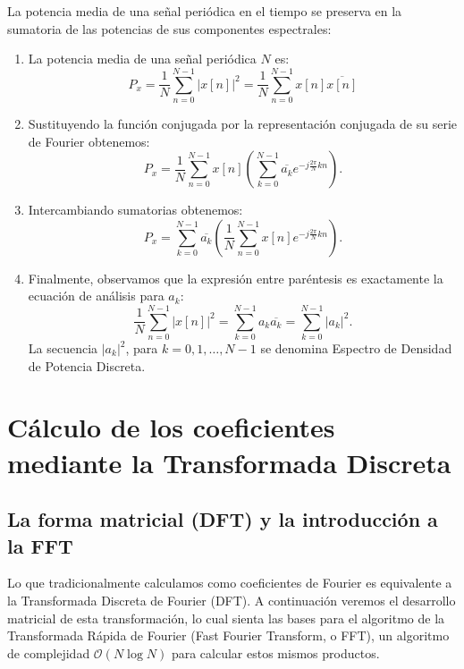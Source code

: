 \documentclass[11pt,a4paper,openany]{book}
\begin{document}
La potencia media de una señal periódica en el tiempo se preserva en la sumatoria de las potencias de sus componentes espectrales:
\begin{enumerate}
	\item La potencia media de una señal periódica $N$ es:
	\begin{equation}
		P_x = \frac{1}{N}\sum_{n=0}^{N-1} |x[n]|^{2} = \frac{1}{N}\sum_{n=0}^{N-1} x[n] \overline{x[n]}
	\end{equation}
	
	\item Sustituyendo la función conjugada por la representación conjugada de su serie de Fourier obtenemos:
	\begin{equation}
		P_x = \frac{1}{N} \sum_{n=0}^{N-1} x[n] \left(\sum_{k=0}^{N-1} \overline{a_{k}} e^{-j\frac{2\pi}{N}kn} \right).
	\end{equation}
	
	\item Intercambiando sumatorias obtenemos:
	\begin{equation}
		P_x = \sum_{k=0}^{N-1} \overline{a_{k}} \left( \frac{1}{N}\sum_{n=0}^{N-1} x[n] e^{-j\frac{2\pi}{N}kn} \right).
	\end{equation}
	
	\item Finalmente, observamos que la expresión entre paréntesis es exactamente la ecuación de análisis para $a_{k}$:
	\begin{equation}
		\frac{1}{N}\sum_{n=0}^{N-1} |x[n]|^{2} = \sum_{k=0}^{N-1} a_{k} \overline{a_{k}} = \sum_{k=0}^{N-1} |a_{k}|^2.
	\end{equation}
	La secuencia $|a_{k}|^{2}$, para $k = 0, 1, \dots, N - 1$ se denomina Espectro de Densidad de Potencia Discreta.
\end{enumerate}

\section{Cálculo de los coeficientes mediante la Transformada Discreta}

\subsection{La forma matricial (DFT) y la introducción a la FFT}

Lo que tradicionalmente calculamos como coeficientes de Fourier es equivalente a la Transformada Discreta de Fourier (DFT). A continuación veremos el desarrollo matricial de esta transformación, lo cual sienta las bases para el algoritmo de la Transformada Rápida de Fourier (Fast Fourier Transform, o FFT), un algoritmo de complejidad $\mathcal{O}(N \log N)$ para calcular estos mismos productos.
\end{document}
